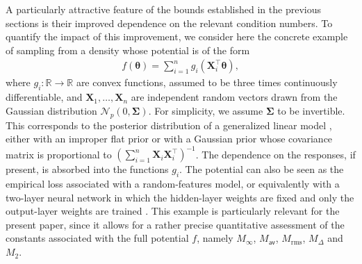 \documentclass[aos,reqno]{imsart}
\newcommand\bX{\boldsymbol X}
\newcommand\btheta{\boldsymbol\theta}
\newcommand\bSigma{\boldsymbol\Sigma}
\def\Mav{M_{\textsf{av}}}
\def\Mmax{M_{\infty}}
\def\Mtwo{M_{\mathrm{rms}}}
\theoremstyle{definition}
\begin{document}
A particularly attractive feature of the bounds 
established in the previous sections is their improved 
dependence on the relevant condition numbers. To 
quantify the impact of this improvement, we consider 
here the concrete example of sampling from a density 
whose potential is of the form
\begin{align}\label{GLM}
    f(\btheta) = \sum_{i=1}^n g_i(\bX_i^\top\btheta),
\end{align}
where $g_i:\mathbb R\to\mathbb R$ are convex functions, 
assumed to be three times continuously differentiable, 
and $\bX_1,\ldots,\bX_n$ are independent random vectors 
drawn from the Gaussian distribution $\mathcal N_p(0, 
\bSigma)$. For simplicity, we assume $\bSigma$ to be 
invertible. 
This corresponds to the posterior distribution of a
generalized linear model \citep{gelman2013,ibrahim1991,
nelder1972}, either with an improper flat prior or 
with a Gaussian prior whose covariance matrix is 
proportional to $(\sum_{i=1}^n \bX_i\bX_i^\top)^{-1}$. 
The dependence on the responses, if present, is 
absorbed into the functions $g_i$. The potential can 
also be seen as the empirical loss associated with a 
random-features model, or equivalently with a 
two-layer neural network in which the hidden-layer
weights are fixed and only the output-layer weights 
are trained \citep{bach2017,gerace20,mei2022}. 
This example is particularly relevant for the present 
paper, since it allows for a rather precise 
quantitative assessment of the constants associated 
with the full potential $f$, namely $\Mmax$, $\Mav$, 
$\Mtwo$, $M_\Delta$ and $M_2$.
\end{document}
